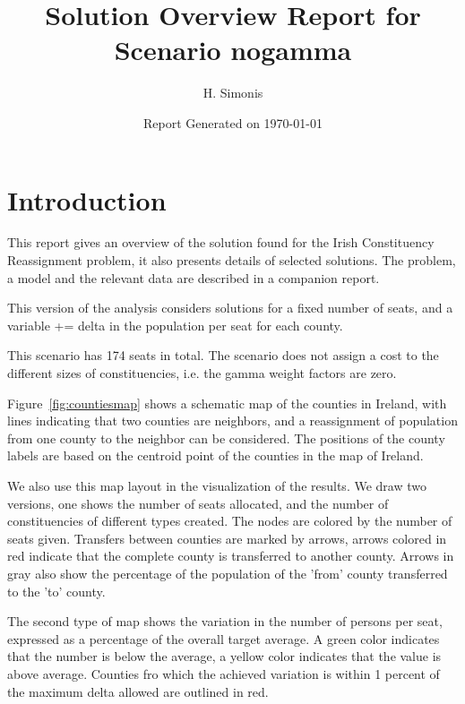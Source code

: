 \documentclass[a4paper]{article}
\title{Solution Overview Report for Scenario nogamma}
\author{H. Simonis}
\date{Report Generated on \today}
\begin{document}
\maketitle
\section{Introduction}

This report gives an overview of the solution found for the Irish Constituency Reassignment problem, it also presents details of selected solutions. The problem, a model and the relevant data are described in a companion report.

This version of the analysis considers solutions for a fixed number of seats, and a variable += delta in the population per seat for each county.

This scenario has 174 seats in total. The scenario does not assign a cost to the different sizes of constituencies, i.e. the gamma weight factors are zero.

\clearpage
Figure~\ref{fig:countiesmap} shows a schematic map of the counties in Ireland, with lines indicating that two counties are neighbors, and a reassignment of population from one county to the neighbor can be considered. The positions of the county labels are based on the centroid point of the counties in the map of Ireland.

We also use this map layout in the visualization of the results. We draw two versions, one shows the number of seats allocated, and the number of constituencies of different types created. The nodes are colored by the number of seats given. Transfers between counties are marked by arrows, arrows colored in red indicate that the complete county is transferred to another county. Arrows in gray also show the percentage of the population of the 'from' county transferred to the 'to' county.

The second type of map shows the variation in the number of persons per seat, expressed as a percentage of the overall target average. A green color indicates that the number is below the average, a yellow color indicates that the value is above average. Counties fro which the achieved variation is within 1 percent of the maximum delta allowed are outlined in red.
\end{document}
